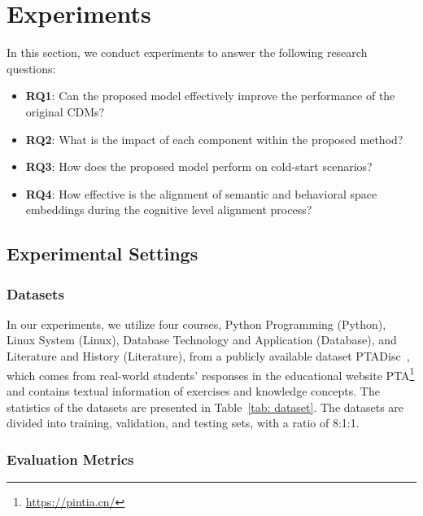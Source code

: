 
\section{Experiments}
\label{sec: exp}

In this section, we conduct experiments to answer the following research questions:
\begin{itemize}
\item \textbf{RQ1}: Can the proposed model effectively improve the performance of the original CDMs?  
\item \textbf{RQ2}: What is the impact of each component within the proposed method? 
\item \textbf{RQ3}: How does the proposed model perform on cold-start scenarios? 
\item \textbf{RQ4}: How effective is the alignment of semantic and behavioral space embeddings during the cognitive level alignment process?
\end{itemize}

\subsection{Experimental Settings}

\subsubsection{Datasets}


In our experiments, we utilize four courses, Python Programming (Python), Linux System (Linux), Database Technology and Application (Database), and Literature and History (Literature), from a publicly available dataset PTADisc~\cite{hu2023ptadisc}, which comes from real-world students' responses in the educational website PTA\footnote{\url{https://pintia.cn/}} and contains textual information of exercises and knowledge concepts. 
The statistics of the datasets are presented in Table~\ref{tab: dataset}.
The datasets are divided into training, validation, and testing sets, with a ratio of 8:1:1.

\subsubsection{Evaluation Metrics}

